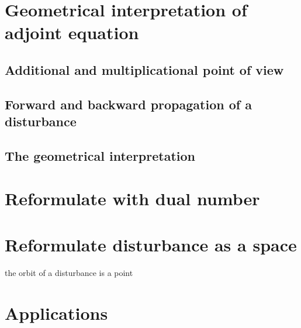 \documentclass{article}
\begin{document}
\section{Geometrical interpretation of adjoint equation}

\subsection{Additional and multiplicational point of view}

\subsection{Forward and backward propagation of a disturbance}

\subsection{The geometrical interpretation}

\section{Reformulate with dual number}

\section{Reformulate disturbance as a space}

the orbit of a disturbance is a point

\section{Applications}



\end{document}
